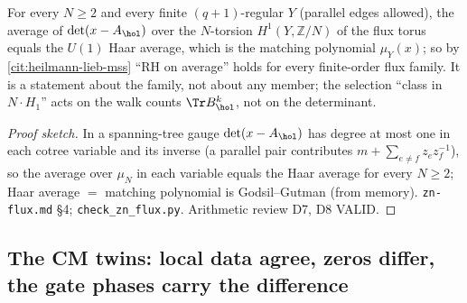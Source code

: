 \begin{theorem}
\label{thm:gkp-torsion-average-matching} 
For every $N\ge2$ and every finite $(q+1)$-regular $Y$ (parallel edges allowed), the average of $\det(x-A_{\hol})$ over the $N$-torsion $H^1(Y,\mathbb Z/N)$ of the flux torus
equals the $U(1)$ Haar average, which is the matching polynomial $\mu_Y(x)$; so by \cref{cit:heilmann-lieb-mss} ``RH on average'' holds for every finite-order flux family. It is %
a statement about the family, not about any member; the selection ``class in $N\cdot H_1$'' acts on the walk counts $\Tr B_{\hol}^k$, not on the determinant.
\end{theorem}
\begin{proof}[Proof sketch] In a spanning-tree gauge $\det(x-A_{\hol})$ has degree at most one in each cotree variable and its inverse (a parallel pair contributes $m+\sum_{e\ne
f}z_ez_f^{-1}$), so the average over $\mu_N$ in each variable equals the Haar average for every $N\ge2$; Haar average $=$ matching polynomial is Godsil--Gutman (from memory). %
\texttt{zn-flux.md} \S4; \texttt{check\_zn\_flux.py}. Arithmetic review D7, D8 VALID.
\end{proof}

\subsection{The CM twins: local data agree, zeros differ, the gate phases carry the difference}

